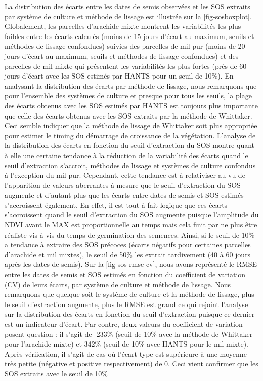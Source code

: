 La distribution des écarts entre les dates de semis observées et les SOS extraits par système de culture et méthode de lissage est illustrée sur la \cref{fig-sosboxplot}. Globalement, les parcelles d'arachide mixte montrent les variabilités les plus faibles entre les écarts calculés (moins de 15 jours d'écart au maximum, seuils et méthodes de lissage confondues) suivies des parcelles de mil pur (moins de 20 jours d'écart au maximum, seuils et méthodes de lissage confondues) et des parcelles de mil mixte qui présentent les variabilités les plus fortes (près de 60 jours d'écart avec les SOS estimés par HANTS pour un seuil de 10\%). En analysant la distribution des écarts par méthode de lissage, nous remarquons que pour l'ensemble des systèmes de culture et presque pour tous les seuils, la plage des écarts obtenus avec les SOS estimés par HANTS est toujours plus importante que celle des écarts obtenus avec les SOS extraits par la méthode de Whittaker. Ceci semble indiquer que la méthode de lissage de Whittaker soit plus appropriée pour estimer le timing du démarrage de croissance de la végétation. L'analyse de la distribution des écarts en fonction du seuil d'extraction du SOS montre quant à elle une certaine tendance à la réduction de la variabilité des écarts quand le seuil d'extraction s'accroit, méthodes de lissage et systèmes de culture confondus à l'exception du mil pur. Cependant, cette tendance est à relativiser au vu de l'apparition de valeurs aberrantes à mesure que le seuil d'extraction du SOS augmente et d'autant plus que les écarts entre dates de semis et SOS estimés s'accroissent également. En effet, il est tout à fait logique que ces écarts s'accroissent quand le seuil d'extraction du SOS augmente puisque l'amplitude du NDVI avant le MAX est proportionnelle au temps mais cela finit par ne plus être réaliste vis-à-vis du temps de germination des semences. Ainsi, si le seuil de 10\% a tendance à extraire des SOS précoces (écarts négatifs pour certaines parcelles d'arachide et mil mixtes), le seuil de 50\% les extrait tardivement (40 à 60 jours après les dates de semis). Sur la \cref{fig-sos-rmse-cv}, nous avons représenté le RMSE entre les dates de semis et SOS estimés en fonction du coefficient de variation (CV) de leurs écarts, par système de culture et méthode de lissage. Nous remarquons que quelque soit le système de culture et la méthode de lissage, plus le seuil d'extraction augmente, plus le RMSE est grand ce qui rejoint l'analyse sur la distribution des écarts en fonction du seuil d'extraction puisque ce dernier est un indicateur d'écart. Par contre, deux valeurs du coefficient de variation posent question : il s'agit de -233\% (seuil de 10\% avec la méthode de Whittaker pour l'arachide mixte) et 342\% (seuil de 10\% avec HANTS pour le mil mixte). Après vériication, il s'agit de cas où l'écart type est supérieure à une moyenne très petite (négative et positive respectivement) de 0. Ceci vient confirmer que les SOS extraits avec le seuil de 10\%





